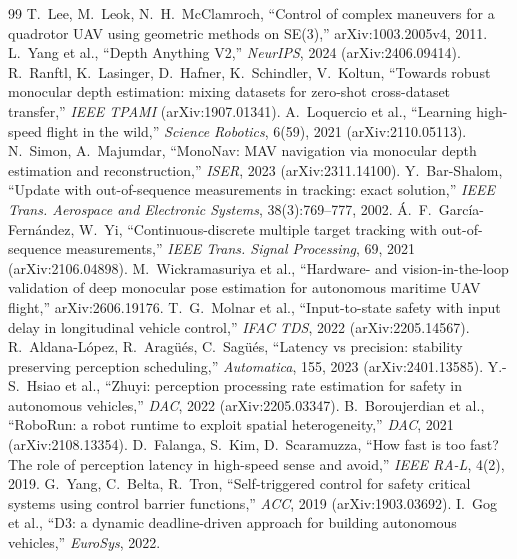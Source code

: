 \documentclass[11pt,a4paper]{article}
\numberwithin{equation}{section}
\theoremstyle{definition}
\theoremstyle{plain}
\theoremstyle{remark}
\begin{document}
\begin{thebibliography}{99}
 T.~Lee, M.~Leok, N.~H.~McClamroch, ``Control of complex maneuvers for a quadrotor UAV using geometric methods on SE(3),'' arXiv:1003.2005v4, 2011.
 L.~Yang et al., ``Depth Anything V2,'' \emph{NeurIPS}, 2024 (arXiv:2406.09414).
 R.~Ranftl, K.~Lasinger, D.~Hafner, K.~Schindler, V.~Koltun, ``Towards robust monocular depth estimation: mixing datasets for zero-shot cross-dataset transfer,'' \emph{IEEE TPAMI} (arXiv:1907.01341).
 A.~Loquercio et al., ``Learning high-speed flight in the wild,'' \emph{Science Robotics}, 6(59), 2021 (arXiv:2110.05113).
 N.~Simon, A.~Majumdar, ``MonoNav: MAV navigation via monocular depth estimation and reconstruction,'' \emph{ISER}, 2023 (arXiv:2311.14100).
 Y.~Bar-Shalom, ``Update with out-of-sequence measurements in tracking: exact solution,'' \emph{IEEE Trans. Aerospace and Electronic Systems}, 38(3):769--777, 2002.
 \'A.~F.~Garc\'ia-Fern\'andez, W.~Yi, ``Continuous-discrete multiple target tracking with out-of-sequence measurements,'' \emph{IEEE Trans. Signal Processing}, 69, 2021 (arXiv:2106.04898).
 M.~Wickramasuriya et al., ``Hardware- and vision-in-the-loop validation of deep monocular pose estimation for autonomous maritime UAV flight,'' arXiv:2606.19176.
 T.~G.~Molnar et al., ``Input-to-state safety with input delay in longitudinal vehicle control,'' \emph{IFAC TDS}, 2022 (arXiv:2205.14567).
 R.~Aldana-L\'opez, R.~Arag\"u\'es, C.~Sag\"u\'es, ``Latency vs precision: stability preserving perception scheduling,'' \emph{Automatica}, 155, 2023 (arXiv:2401.13585).
 Y.-S.~Hsiao et al., ``Zhuyi: perception processing rate estimation for safety in autonomous vehicles,'' \emph{DAC}, 2022 (arXiv:2205.03347).
 B.~Boroujerdian et al., ``RoboRun: a robot runtime to exploit spatial heterogeneity,'' \emph{DAC}, 2021 (arXiv:2108.13354).
 D.~Falanga, S.~Kim, D.~Scaramuzza, ``How fast is too fast? The role of perception latency in high-speed sense and avoid,'' \emph{IEEE RA-L}, 4(2), 2019.
 G.~Yang, C.~Belta, R.~Tron, ``Self-triggered control for safety critical systems using control barrier functions,'' \emph{ACC}, 2019 (arXiv:1903.03692).
 I.~Gog et al., ``D3: a dynamic deadline-driven approach for building autonomous vehicles,'' \emph{EuroSys}, 2022.

\end{thebibliography}
\end{document}
